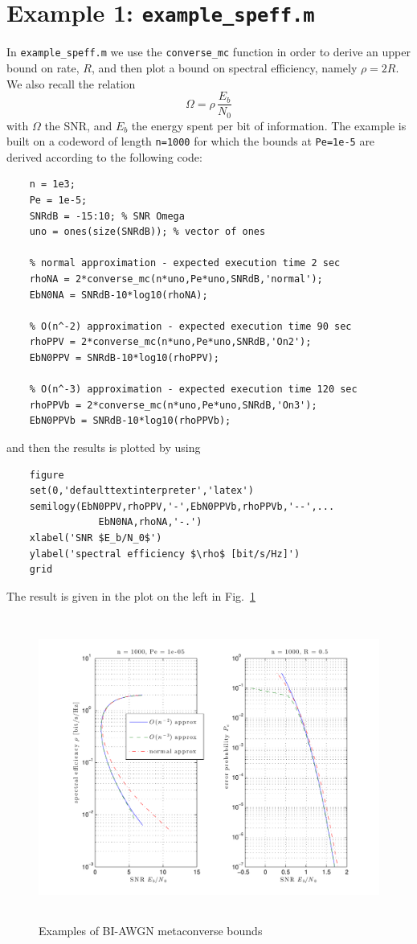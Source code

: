 \documentclass[a4paper,11p]{memoir}
\begin{document}
\section{Example 1: \texttt{example\_speff.m}}

In \verb|example_speff.m| we use the \verb|converse_mc| function in order to derive an upper bound on rate, $R$, and then plot a bound on spectral efficiency, namely $\rho=2R$. We also recall the relation 
$$
\Omega = \rho\, \frac{E_b}{N_0} 
$$
with $\Omega$ the SNR, and $E_b$ the energy spent per bit of information. The example is built on a codeword of length \verb|n=1000|  for which the bounds at \verb|Pe=1e-5| are derived according to  the following code:
\begin{verbatim}
    n = 1e3;
    Pe = 1e-5;
    SNRdB = -15:10; % SNR Omega
    uno = ones(size(SNRdB)); % vector of ones

    % normal approximation - expected execution time 2 sec    
    rhoNA = 2*converse_mc(n*uno,Pe*uno,SNRdB,'normal'); 
    EbN0NA = SNRdB-10*log10(rhoNA);
    
    % O(n^-2) approximation - expected execution time 90 sec
    rhoPPV = 2*converse_mc(n*uno,Pe*uno,SNRdB,'On2'); 
    EbN0PPV = SNRdB-10*log10(rhoPPV);
    
    % O(n^-3) approximation - expected execution time 120 sec
    rhoPPVb = 2*converse_mc(n*uno,Pe*uno,SNRdB,'On3'); 
    EbN0PPVb = SNRdB-10*log10(rhoPPVb);
\end{verbatim}
and then the results is plotted by using
\begin{verbatim}
    figure
    set(0,'defaulttextinterpreter','latex')
    semilogy(EbN0PPV,rhoPPV,'-',EbN0PPVb,rhoPPVb,'--',...
                EbN0NA,rhoNA,'-.')
    xlabel('SNR $E_b/N_0$')
    ylabel('spectral efficiency $\rho$ [bit/s/Hz]')
    grid
\end{verbatim}
The result is given in the plot on the left in Fig.~\ref{fig:biawgn_example}
\begin{figure}[h]
\centering
\includegraphics[height=10cm]{plots/biawgn_plot1_ex}
\caption{Examples of BI-AWGN metaconverse bounds}\label{fig:biawgn_example}
\end{figure}
\end{document}
